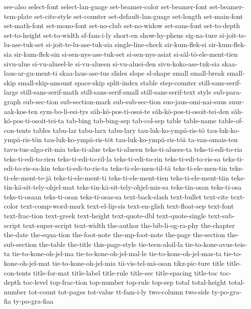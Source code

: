 {see-also
select-font
select-lan-guage
set-beamer-color
set-beamer-font
set-beamer-tem-plate
set-cite-style
set-counter
set-default-lan-guage
set-length
set-main-font
set-math-font
set-mono-font
set-no-club
set-no-widow
set-sans-font
set-to-depth
set-to-height
set-to-width
sf-fam-i-ly
short-en
show-hy-phens
sig-na-ture
si-joit-te-lu-ase-tuk-set
si-joit-te-lu-ase-tuk-sia
single-line-check
sir-kum-flek-si
sir-kum-flek-sia
sir-kum-flek-sin
si-sen-nys-ase-tuk-set
si-sen-nys-asiat
si-säl-tö-ele-ment-tien
sivu-alue
si-vu-alueel-le
si-vu-alueen
si-vu-aluei-den
sivu-koko-ase-tuk-sia
skaa-laus-ar-gu-ment-ti
skaa-laus-ase-tus
slides
slope
sl-shape
small
small-break
small-skip
small-skip-amount
space-skip
split-index
stable
step-counter
still-sans-serif-large
still-sans-serif-math
still-sans-serif-small
still-sans-serif-text
style
sub-para-graph
sub-sec-tion
sub-section-mark
sub-sub-sec-tion
suo-jaus-omi-nai-suus
suur-aak-kos-ten
sym-bo-li-esi-tys
säh-kö-pos-ti-osoi-te
säh-kö-pos-ti-osoit-tei-den
säh-kö-pos-ti-osoit-tei-ta
tab-bing
tab-bing-sep
tab-col-sep
table
table-name
table-of-con-tents
tables
tabu-lar
tabu-larx
tabu-lary
tau-luk-ko-ympä-ris-tö
tau-luk-ko-ympä-ris-tön
tau-luk-ko-ympä-ris-töt
tau-luk-ko-ympä-ris-töä
ta-van-omais-ten
tavu-tus-algo-rit-mia
teks-ti-alue
teks-ti-alueen
teks-ti-aluees-ta
teks-ti-edi-to-ria
teks-ti-edi-to-rien
teks-ti-edi-to-ril-la
teks-ti-edi-to-rin
teks-ti-edi-to-ris-sa
teks-ti-edi-to-ris-sa-kin
teks-ti-edi-to-ris-ta
teks-ti-ele-men-til-tä
teks-ti-ele-men-tin
teks-ti-ele-ment-te-jä
teks-ti-ele-ment-ti
teks-ti-ele-ment-tien
teks-ti-ele-ment-tiin
teks-tin-kä-sit-tely-ohjel-mat
teks-tin-kä-sit-tely-ohjel-mis-sa
teks-tin-osan
teks-ti-osa
teks-ti-osaan
teks-ti-osan
teks-ti-osas-sa
text-back-slash
text-bullet
text-cite
text-color
text-comp-word-mark
text-el-lip-sis
text-en-glish
text-float-sep
text-font
text-frac-tion
text-greek
text-height
text-quote-dbl
text-quote-single
text-sub-script
text-super-script
text-width
the-author
the-bib-li-og-ra-phy
the-chapter
the-date
the-equa-tion
the-foot-note
the-mp-foot-note
the-page
the-section
the-sub-section
the-table
the-title
this-page-style
tie-teen-aloil-la
tie-to-kone-avus-teis-ta
tie-to-kone-oh-jel-ma
tie-to-kone-oh-jel-mal-le
tie-to-kone-oh-jel-mas-ta
tie-to-kone-oh-jel-mat
tie-to-kone-oh-jel-mia
tii-vis-tel-mä-osan
tikz-pic-ture
title
title-con-tents
title-for-mat
title-label
title-rule
title-sec
title-spacing
title-toc
toc-depth
toc-level
top-frac-tion
top-number
top-rule
top-sep
total
total-height
total-number
tot-count
tot-pages
tot-value
tt-fam-i-ly
two-column
two-side
ty-po-gra-fia
ty-po-gra-fiaa
}
